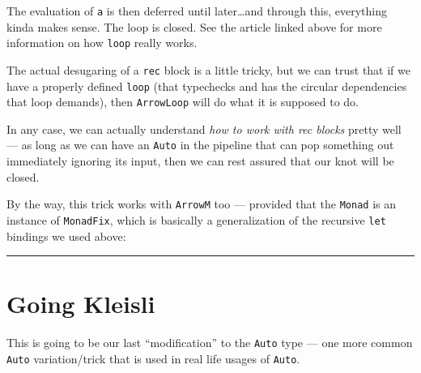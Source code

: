 \documentclass[]{article}
\newenvironment{Shaded}{}{}
\newcommand{\CommentTok}[1]{\textcolor[rgb]{0.38,0.63,0.69}{\textit{#1}}}
\newcommand{\DataTypeTok}[1]{\textcolor[rgb]{0.56,0.13,0.00}{#1}}
\newcommand{\FunctionTok}[1]{\textcolor[rgb]{0.02,0.16,0.49}{#1}}
\newcommand{\KeywordTok}[1]{\textcolor[rgb]{0.00,0.44,0.13}{\textbf{#1}}}
\newcommand{\NormalTok}[1]{#1}
\newcommand{\OperatorTok}[1]{\textcolor[rgb]{0.40,0.40,0.40}{#1}}
\newcommand{\OtherTok}[1]{\textcolor[rgb]{0.00,0.44,0.13}{#1}}
\begin{document}
The evaluation of \texttt{a\textquotesingle{}} is then deferred until
later\ldots and through this, everything kinda makes sense. The loop is closed.
See the article linked above for more information on how \texttt{loop} really
works.

The actual desugaring of a \texttt{rec} block is a little tricky, but we can
trust that if we have a properly defined \texttt{loop} (that typechecks and has
the circular dependencies that loop demands), then \texttt{ArrowLoop} will do
what it is supposed to do.

In any case, we can actually understand \emph{how to work with rec blocks}
pretty well --- as long as we can have an \texttt{Auto} in the pipeline that can
pop something out immediately ignoring its input, then we can rest assured that
our knot will be closed.

By the way, this trick works with \texttt{ArrowM} too --- provided that the
\texttt{Monad} is an instance of \texttt{MonadFix}, which is basically a
generalization of the recursive \texttt{let} bindings we used above:

\begin{Shaded}
\end{Shaded}

\begin{center}\rule{0.5\linewidth}{0.5pt}\end{center}

\section{Going Kleisli}\label{going-kleisli}

This is going to be our last ``modification'' to the \texttt{Auto} type --- one
more common \texttt{Auto} variation/trick that is used in real life usages of
\texttt{Auto}.
\end{document}
